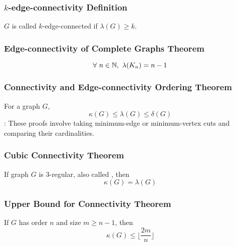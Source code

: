 \subsubsection*{$k$-edge-connectivity Definition}
$G$ is called $k$-edge-connected if $\lambda(G) \geq k$.

\subsubsection*{Edge-connectivity of Complete Graphs Theorem}
\[
    \forall~n \in \mathbb{N},~\lambda(K_n) = n-1
\]

\subsubsection*{Connectivity and Edge-connectivity Ordering Theorem}
For a graph $G$,
\[
    \kappa(G) \leq \lambda(G) \leq \delta(G)
\]
: These proofs involve taking minimum-edge or minimum-vertex cuts and comparing their cardinalities.

\subsubsection*{Cubic Connectivity Theorem}
If graph $G$ is 3-regular, also called , then
\[
    \kappa(G) = \lambda(G)
\]

\subsubsection*{Upper Bound for Connectivity Theorem}
If $G$ has order $n$ and size $m \geq n-1$, then
\[
    \kappa(G) \leq \lfloor \frac{2m}{n} \rfloor
\]